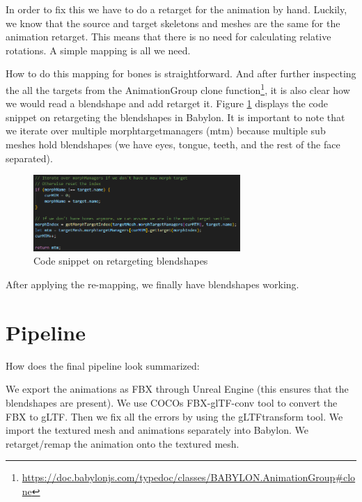 \documentclass{uva-inf-article}
\begin{document}
In order to fix this we have to do a retarget for the animation by hand. Luckily, we know that the source and target skeletons and meshes are the same for the animation retarget. This means that there is no need for calculating relative rotations. A simple mapping is all we need.

How to do this mapping for bones is straightforward\cite{babForum}. And after further inspecting the all the targets from the AnimationGroup clone function\footnote{\url{https://doc.babylonjs.com/typedoc/classes/BABYLON.AnimationGroup\#clone}}, it is also clear how we would read a blendshape and add retarget it.
Figure \ref{fig:mtm} displays the code snippet on retargeting the blendshapes in Babylon. It is important to note that we iterate over multiple morphtargetmanagers (mtm) because multiple sub meshes hold blendshapes (we have eyes, tongue, teeth, and the rest of the face separated).

\begin{figure}[hbt!]
    \centering
    \includegraphics[width=0.7\textwidth]{imgs/mtm.png}
    \caption{Code snippet on retargeting blendshapes}
    \label{fig:mtm}
\end{figure}

After applying the re-mapping, we finally have blendshapes working.

\section{Pipeline}
How does the final pipeline look summarized:
\begin{center}
We export the animations as FBX through Unreal Engine (this ensures that the blendshapes are present). We use COCOs FBX-glTF-conv tool to convert the FBX to gLTF. Then we fix all the errors by using the gLTFtransform tool. We import the textured mesh and animations separately into Babylon. We retarget/remap the animation onto the textured mesh.
\end{center}

\end{document}

